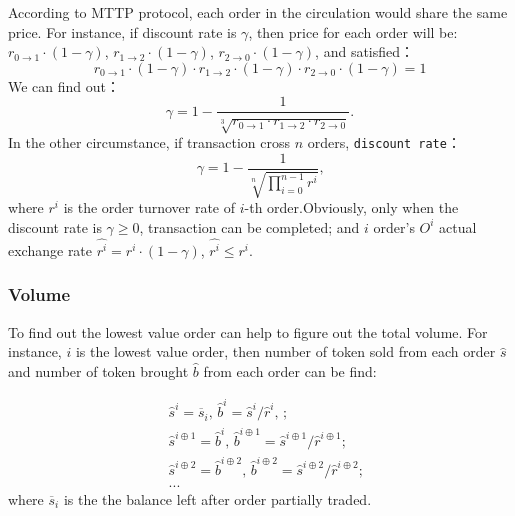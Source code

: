 \documentclass[UTF8,nofonts]{article}
\begin{document}
According to MTTP protocol, each order in the circulation would share the same price. For instance, if discount rate is $\gamma$, then price for each order will be:
$r_{0\rightarrow 1} \cdot (1-\gamma)$, $r_{1\rightarrow 2} \cdot (1-\gamma)$, $r_{2 \rightarrow 0} \cdot (1-\gamma)$, and satisfied：
\begin{equation}
r_{0\rightarrow 1} \cdot (1-\gamma)\cdot r_{1\rightarrow 2} \cdot (1-\gamma) \cdot r_{2 \rightarrow 0} \cdot (1-\gamma) = 1
\end{equation}
We can find out：
\begin{equation*}
\gamma = 1- \frac{1}{\sqrt[3]{r_{0\rightarrow 1} \cdot r_{1\rightarrow 2} \cdot r_{2\rightarrow 0}}}\text{.}
\end{equation*}
In the other circumstance, if transaction cross $n$ orders, \texttt{discount rate}：
\begin{equation*}
\gamma = 1- \frac{1}{\sqrt[n]{\prod_{i=0}^{n-1} r^i}} \text{,}
\end{equation*}
where $r^i$ is the order turnover rate of $i$-th order.Obviously, only when the discount rate is $\gamma \ge 0$, transaction can be completed; and $i$ order's $O^i$ actual exchange rate $\hat{r^i} = r^i \cdot (1-\gamma)$, $\hat{r^i}\le r^i$.



\subsubsection{Volume\label{sec: matchquantity}}

To find out the lowest value order can help to figure out the total volume. For instance, $i$ is the lowest value order, then number of token sold from each order $\hat{s}$ and number of token brought $\hat{b}$ from each order can be find:

\[
\begin{split}
&\hat{s}^{i}=\overline{s}_i\text{, } \hat{b}^{i}=\hat{s}^{i}/ \hat{r}^i\text{, }\text{;}\\
&\hat{s}^{i\oplus 1}=\hat{b}^i\text{, } \hat{b}^{i\oplus 1}=\hat{s}^{i\oplus 1}/ \hat{r}^{i\oplus 1}\text{;}\\
&\hat{s}^{i\oplus 2}=\hat{b}^{i\oplus 2}\text{, } \hat{b}^{i\oplus 2}=\hat{s}^{i\oplus 2}/ \hat{r}^{i\oplus 2}\text{;}\\
& ...
\end{split}
\]
where $\overline{s}_i$ is the the balance left after order partially traded.
\end{document}
